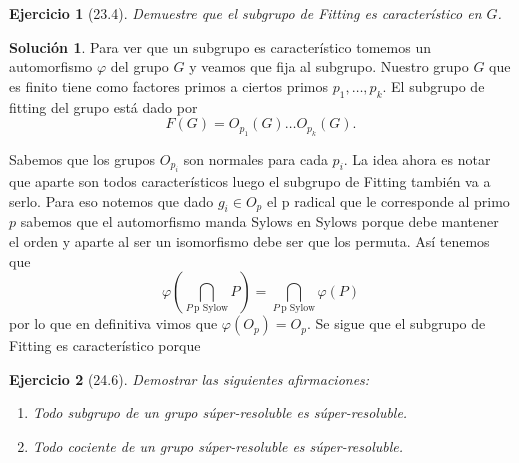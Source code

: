 \documentclass[11pt]{article}
\theoremstyle{plain}
\newtheorem*{ej}{Ejercicio}
\theoremstyle{definition}
\newtheorem*{sol}{Solución}
\theoremstyle{remark}
\begin{document}
\bigskip
\begin{tcolorbox}[colback=teal!25!white,colframe=teal!75!black]
	\begin{ej}[23.4]
		Demuestre que el subgrupo de Fitting es característico en $G$.
	\end{ej}	
\end{tcolorbox}
\medskip
\begin{sol}
	Para ver que un subgrupo es característico tomemos un automorfismo $\varphi$ del grupo $G$ y veamos que fija al subgrupo. Nuestro grupo $G$ que es finito tiene como factores primos a ciertos primos $p_1, \dots, p_k$. El subgrupo de fitting del grupo está dado por 
	\[
	F(G) =  O_{p_1}(G) \dots O_{p_k}(G).
	\]
	
	Sabemos que los grupos $O_{p_i}$ son normales para cada $p_i$. La idea ahora es notar que aparte son todos característicos luego el subgrupo de Fitting también va a serlo. Para eso notemos que dado $g_i \in O_{p}$ el p radical que le corresponde al primo $p$ sabemos que el automorfismo manda Sylows en Sylows porque debe mantener el orden y aparte al ser un isomorfismo debe ser que los permuta. Así tenemos que 
	\[
	\varphi \left(   \bigcap_{{P \   \text{p Sylow}}}  P \right)  = \bigcap_{P \   \text{p Sylow}} \varphi(P)
	\] 
	por lo que en definitiva vimos que $\varphi(O_p)=O_p$. Se sigue que el subgrupo de Fitting es característico porque
\end{sol}

\bigskip
\begin{tcolorbox}[colback=teal!25!white,colframe=teal!75!black]
	\begin{ej}[24.6]
		Demostrar las siguientes afirmaciones:
		\begin{enumerate}
			\item Todo subgrupo de un grupo súper-resoluble es súper-resoluble.
			\item Todo cociente de un grupo súper-resoluble es súper-resoluble.
		\end{enumerate}
	\end{ej}	
\end{tcolorbox}
\medskip
\end{document}
